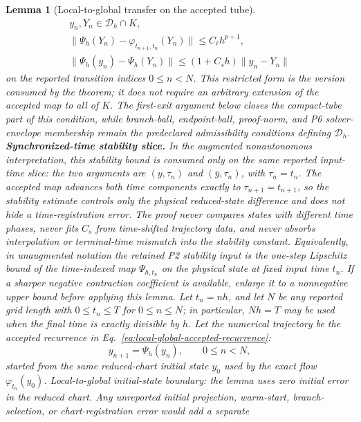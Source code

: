 \documentclass[preprint,12pt]{elsarticle}
\newtheorem{lemma}{Lemma}
\begin{document}
\begin{lemma}[Local-to-global transfer on the accepted tube]
\begin{equation}
\label{eq:local-global-restricted-domain}
\begin{gathered}
  y_n,Y_n\in \mathcal D_h\cap K,\\
  \|\Psi_h(Y_n)-\varphi_{t_{n+1},t_n}(Y_n)\|
  \le C_\ell h^{p+1},\\
  \|\Psi_h(y_n)-\Psi_h(Y_n)\|
  \le (1+C_s h)\|y_n-Y_n\|
\end{gathered}
\end{equation}
on the reported transition indices \(0\le n<N\).  This restricted form is
the version consumed by the theorem; it does not require an arbitrary
extension of the accepted map to all of \(K\).  The first-exit argument below
closes the compact-tube part of this condition, while branch-ball,
endpoint-ball, proof-norm, and P6 solver-envelope membership remain the
predeclared admissibility conditions defining \(\mathcal D_h\).
\noindent\textbf{Synchronized-time stability slice.}
In the augmented nonautonomous interpretation, this stability bound is
consumed only on the same reported input-time slice: the two arguments are
\((y,\tau_n)\) and \((\bar y,\tau_n)\), with \(\tau_n=t_n\). The accepted
map advances both time components exactly to \(\tau_{n+1}=t_{n+1}\), so the
stability estimate controls only the physical reduced-state difference and
does not hide a time-registration error. The proof never compares states with
different time phases, never fits \(C_s\) from time-shifted trajectory data,
and never absorbs interpolation or terminal-time mismatch into the stability
constant. Equivalently, in unaugmented notation the retained P2 stability
input is the one-step Lipschitz bound of the time-indexed map
\(\Psi_{h,t_n}\) on the physical state at fixed input time \(t_n\).
If a sharper negative contraction
coefficient is available, enlarge it to a nonnegative upper bound before
applying this lemma. Let \(t_n=n h\), and let \(N\) be any reported grid
length with \(0\le t_n\le T\) for \(0\le n\le N\); in particular,
\(Nh=T\) may be used when the final time is exactly divisible by \(h\).
Let the numerical trajectory be the accepted recurrence in
Eq.~\eqref{eq:local-global-accepted-recurrence}:
\begin{equation}
\label{eq:local-global-accepted-recurrence}
  y_{n+1}=\Psi_h(y_n),\qquad 0\le n<N,
\end{equation}
started from the same reduced-chart initial state \(y_0\) used by the exact
flow \(\varphi_{t_n}(y_0)\).
Local-to-global initial-state boundary: the lemma uses zero
initial error in the reduced chart. Any unreported initial projection,
warm-start, branch-selection, or chart-registration error would add a separate

\end{lemma}
\end{document}
